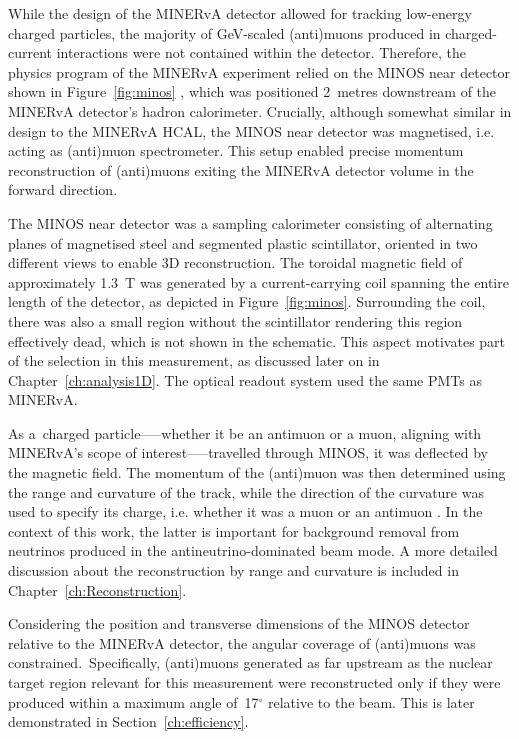 While the design of the MINERvA detector allowed for tracking low-energy charged particles, the majority of GeV-scaled (anti)muons produced in charged-current interactions were not contained within the detector. Therefore, the physics program of the MINERvA experiment relied on the MINOS near detector shown in Figure~\ref{fig:minos} \cite{minos_MICHAEL2008190}, which was positioned 2~metres downstream of the MINERvA detector's hadron calorimeter. Crucially, although somewhat similar in design to the MINERvA HCAL, the MINOS near detector was magnetised, i.e. acting as (anti)muon spectrometer. This setup enabled precise momentum reconstruction of (anti)muons exiting the MINERvA detector volume in the forward direction.

The MINOS near detector \cite{minos_MICHAEL2008190} was a sampling calorimeter consisting of alternating planes of magnetised steel and segmented plastic scintillator, oriented in two different views to enable 3D reconstruction. The toroidal magnetic field of approximately 1.3~T was generated by a current-carrying coil spanning the entire length of the detector, as depicted in Figure~\ref{fig:minos}. Surrounding the coil, there was also a small region without the scintillator rendering this region effectively dead, which is not shown in the schematic. This aspect motivates part of the selection in this measurement, as discussed later on in Chapter~\ref{ch:analysis1D}. The optical readout system used the same PMTs as MINERvA. 

As a~charged \mbox{particle--—whether} it be an antimuon or a muon, aligning with MINERvA's scope of interest--—travelled through MINOS, it was deflected by the magnetic field. The momentum of the (anti)muon was then determined using the range and curvature of the track, while the direction of the curvature was used to specify its charge, i.e. whether it was a muon or an antimuon \cite{ospanov2008measurement}. In the context of this work, the latter is important for background removal from neutrinos produced in the antineutrino-dominated beam mode. A more detailed discussion about the reconstruction by range and curvature is included in Chapter~\ref{ch:Reconstruction}.

Considering the position and transverse dimensions of the MINOS detector relative to the MINERvA detector, the angular coverage of (anti)muons was constrained.~Specifically, (anti)muons generated as far upstream as the nuclear target region relevant for this measurement were reconstructed only if they were produced within a maximum angle of~17$^\circ$ relative to the beam. This is later demonstrated in Section~\ref{ch:efficiency}.


